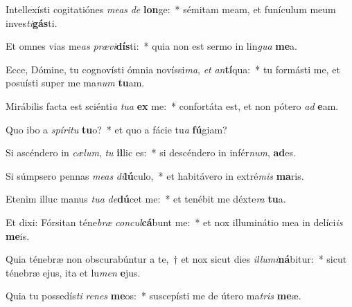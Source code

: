 \item Intellexísti cogitatiónes \textit{me}\textit{as} \textit{de} \textbf{lon}ge:~* sémitam meam, et funículum meum inves\textit{ti}\textbf{gás}ti.
\item Et omnes vias me\textit{as} \textit{præ}\textit{vi}\textbf{dís}ti:~* quia non est sermo in lin\textit{gua} \textbf{me}a.
\item Ecce, Dómine, tu cognovísti ómnia novíssi\textit{ma}, \textit{et} \textit{an}\textbf{tí}qua:~* tu formásti me, et posuísti super me ma\textit{num} \textbf{tu}am.
\item Mirábilis facta est sciénti\textit{a} \textit{tu}\textit{a} \textbf{ex} me:~* confortáta est, et non pótero \textit{ad} \textbf{e}am.
\item Quo ibo a \textit{spí}\textit{ri}\textit{tu} \textbf{tu}o?~* et quo a fácie tu\textit{a} \textbf{fú}giam?
\item Si ascéndero in \textit{cæ}\textit{lum}, \textit{tu} \textbf{il}lic es:~* si descéndero in infér\textit{num}, \textbf{ad}es.
\item Si súmpsero pennas \textit{me}\textit{as} \textit{di}\textbf{lú}culo,~* et habitávero in extré\textit{mis} \textbf{ma}ris.
\item Etenim illuc manus \textit{tu}\textit{a} \textit{de}\textbf{dú}cet me:~* et tenébit me déxte\textit{ra} \textbf{tu}a.
\item Et dixi: Fórsitan téne\textit{bræ} \textit{con}\textit{cul}\textbf{cá}bunt me:~* et nox illuminátio mea in delíci\textit{is} \textbf{me}is.
\item Quia ténebræ non obscurabúntur a te,~† et nox sicut dies \textit{il}\textit{lu}\textit{mi}\textbf{ná}bitur:~* sicut ténebræ ejus, ita et lu\textit{men} \textbf{e}jus.
\item Quia tu possedís\textit{ti} \textit{re}\textit{nes} \textbf{me}os:~* suscepísti me de útero ma\textit{tris} \textbf{me}æ.
